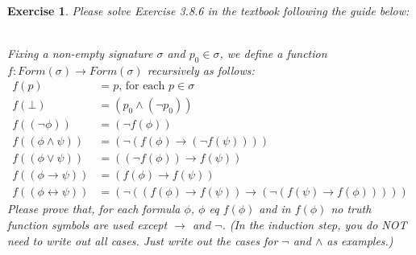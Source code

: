 \documentclass[12pt,a4paper]{article}
\theoremstyle{plain}
\newtheorem{exercise}{Exercise}
\begin{document}
\ \\
\begin{exercise}
Please solve Exercise 3.8.6 in the textbook following the guide below:

\ \\
Fixing a non-empty signature $\sigma$ and $p_0 \in \sigma$, we define a function $f : Form (\sigma) \rightarrow Form (\sigma)$ recursively as follows:
%
\begin{align*}
f (p) &= p \mbox{, for each } p \in \sigma \\
f (\bot) &= ( p_0 \wedge ( \neg p_0 ) ) \\
f ((\neg \phi)) &= ( \neg f ( \phi ) ) \\
f ((\phi \wedge \psi)) &=  ( \neg ( f (\phi) \rightarrow ( \neg f (\psi) ) ) ) \\
f ((\phi \vee \psi)) &= ( ( \neg f (\phi) ) \rightarrow f (\psi) ) \\
f ((\phi \rightarrow \psi)) &= ( f (\phi) \rightarrow f (\psi) ) \\
f ((\phi \leftrightarrow \psi)) &= ( \neg ( ( f (\phi) \rightarrow f (\psi) ) \rightarrow ( \neg ( f (\psi) \rightarrow f (\phi) ) ) ) )
\end{align*}
%
Please prove that, for each formula $\phi$, $\phi$ eq $f (\phi)$ and in $f (\phi)$ no truth function symbols are used except $\rightarrow$ and $\neg$.
(In the induction step, you do NOT need to write out all cases.
Just write out the cases for $\neg$ and $\wedge$ as examples.)
\end{exercise}
\end{document}
